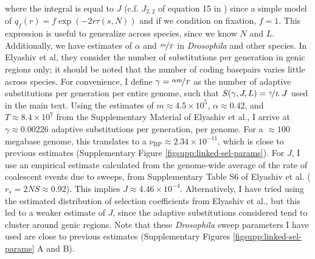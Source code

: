 \documentclass[9pt,lineno]{elife}
\begin{document}
\begin{appendixbox}
where the integral is equal to $J$ (c.f. $J_{2,2}$ of equation 15 in
\cite{Coop2012-cd}) since a simple model of $q_f(r) = f \exp(- 2r \tau(s, N))$
and if we condition on fixation, $f = 1$. This expression is useful to
generalize across species, since we know $N$ and $L$. Additionally, we have
estimates of $\alpha$ and $\nicefrac{m}{T}$ in \emph{Drosophila} and other
species. In Elyashiv et al, they consider the number of substitutions per
generation in genic regions only; it should be noted that the number of coding
basepairs varies little across species. For convenience, I define $\gamma =
\nicefrac{\alpha m}{T}$ as the number of adaptive substitutions per generation
per entire genome, such that $S(\gamma, J, L) = \nicefrac{\gamma}{L} \; J$ used
in the main text. Using the estimates of $m \approx 4.5 \times 10^{5}$, $\alpha
\approx 0.42$, and $T \approx 8.4 \times 10^{7}$ from the Supplementary
Material of Elyashiv et al., I arrive at $\gamma \approx 0.00226$ adaptive
substitutions per generation, per genome. For a $\approx 100$ megabase genome,
this translates to a $\nu_\text{BP} \approx 2.34 \times 10^{-11}$, which is
close to previous estimates (Supplementary Figure
\ref{figsupp:linked-sel-params}). For $J$, I use an empirical estimate
calculated from the genome-wide average of the rate of coalescent events due to
sweeps, from Supplementary Table S6 of Elyashiv et al. ($r_s = 2NS \approx
0.92$). This implies $J \approx 4.46 \times 10^{-4}$. Alternatively, I have
tried using the estimated distribution of selection coefficients from Elyashiv
et al., but this led to a weaker estimate of $J$, since the adaptive
substitutions considered tend to cluster around genic regions. Note that these
\emph{Drosophila} sweep parameters I have used are close to previous estimates
(Supplementary Figures \ref{figsupp:linked-sel-params} A and B). 

\end{appendixbox}
\end{document}
